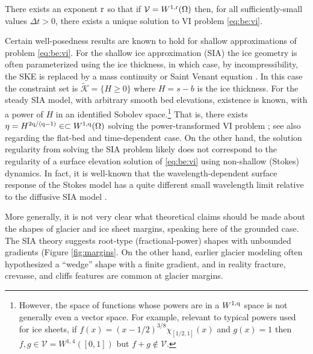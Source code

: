 \documentclass[hidelinks,onefignum,onetabnum,final]{siamart220329}  %
\newcommand{\cK}{\mathcal{K}}
\newcommand{\cV}{\mathcal{V}}
\newcommand{\qq}{{\text{\textnormal{q}}}}
\newcommand{\rr}{{\text{\textnormal{r}}}}
\begin{document}
\begin{conjecture} \label{conj:wellposed:be}
There exists an exponent $\rr$ so that if $\cV = W^{1,\rr}(\Omega)$ then, for all sufficiently-small values $\Delta t>0$, there exists a unique solution to VI problem \eqref{eq:be:vi}.
\end{conjecture}

Certain well-posedness results are known to hold for shallow approximations of problem \eqref{eq:be:vi}.  For the shallow ice approximation (SIA) the ice geometry is often parameterized using the ice thickness, in which case, by incompressibility, the SKE is replaced by a mass continuity or Saint Venant equation \cite{JouvetBueler2012}.  In this case the constraint set is $\tilde{\cK} = \{H\ge 0\}$ where $H=s-b$ is the ice thickness.   For the steady SIA model, with arbitrary smooth bed elevations, existence is known, with a power of $H$ in an identified Sobolev space.\footnote{However, the space of functions whose powers are in a $W^{1,\qq}$ space is not generally even a vector space.  For example, relevant to typical powers used for ice sheets, if $f(x)=(x-1/2)^{3/8} \chi_{[1/2,1]}(x)$ and $g(x)=1$ then $f,g \in \cV = W^{1,4}([0,1])$ but $f+g\notin \cV$.}  That is, there exists $\eta = H^{2\qq/(\qq-1)} \in \subset W^{1,\qq}(\Omega)$ solving the power-transformed VI problem \cite{JouvetBueler2012}; see also \cite{Calvoetal2003,PiersantiTemam2023} regarding the flat-bed and time-dependent case.  On the other hand, the solution regularity from solving the SIA problem likely does not correspond to the regularity of a surface elevation solution of \eqref{eq:be:vi} using non-shallow (Stokes) dynamics.  In fact, it is well-known that the wavelength-dependent surface response of the Stokes model has a quite different small wavelength limit relative to the diffusive SIA model \cite[for example]{Pattynetal2008}.

More generally, it is not very clear what theoretical claims should be made about the shapes of glacier and ice sheet margins, speaking here of the grounded case.  The SIA theory suggests root-type (fractional-power) shapes \cite{Bueleretal2005} with unbounded gradients (Figure \ref{fig:margins}.  On the other hand, earlier glacier modeling often hypothesized a ``wedge'' shape with a finite gradient, and in reality fracture, crevasse, and cliffs features are common at glacier margins.
\end{document}
